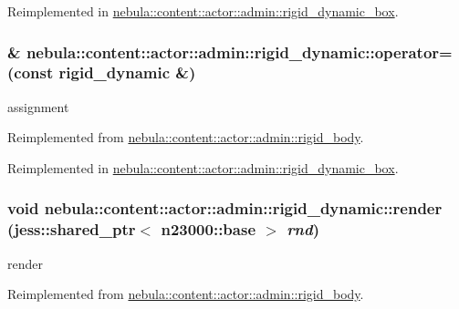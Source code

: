 Reimplemented in \hyperlink{classnebula_1_1content_1_1actor_1_1admin_1_1rigid__dynamic__box_a3d03f28e3ba455be0f39ad66e00c02c9}{nebula::content::actor::admin::rigid\_\-dynamic\_\-box}.\hypertarget{classnebula_1_1content_1_1actor_1_1admin_1_1rigid__dynamic_accf38f3f07acdbe924c46388230d2e99}{
\subsubsection[{operator=}]{\& nebula::content::actor::admin::rigid\_\-dynamic::operator= (const {\bf rigid\_\-dynamic} \&)}}
\label{classnebula_1_1content_1_1actor_1_1admin_1_1rigid__dynamic_accf38f3f07acdbe924c46388230d2e99}


assignment 

Reimplemented from \hyperlink{classnebula_1_1content_1_1actor_1_1admin_1_1rigid__body_a7ed8ba2a35fdf83cf508fe37fde0d875}{nebula::content::actor::admin::rigid\_\-body}.

Reimplemented in \hyperlink{classnebula_1_1content_1_1actor_1_1admin_1_1rigid__dynamic__box_aeed451b7d00e75948f474e4bb20404ba}{nebula::content::actor::admin::rigid\_\-dynamic\_\-box}.\hypertarget{classnebula_1_1content_1_1actor_1_1admin_1_1rigid__dynamic_a891dd9d18ef100af72427ebaea9e473a}{
\subsubsection[{render}]{\setlength{\rightskip}{0pt plus 5cm}void nebula::content::actor::admin::rigid\_\-dynamic::render (jess::shared\_\-ptr$<$ {\bf n23000::base} $>$ {\em rnd})}}
\label{classnebula_1_1content_1_1actor_1_1admin_1_1rigid__dynamic_a891dd9d18ef100af72427ebaea9e473a}


render 

Reimplemented from \hyperlink{classnebula_1_1content_1_1actor_1_1admin_1_1rigid__body_a88b9c26608737c7850b4eef227548a59}{nebula::content::actor::admin::rigid\_\-body}.

